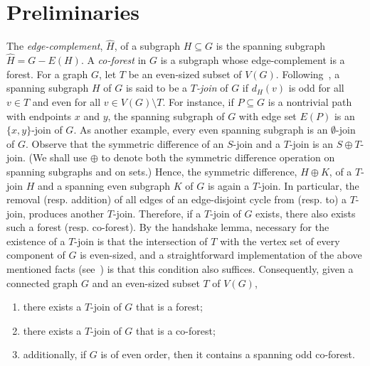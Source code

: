 \documentclass[a4paper,12pt]{article}
\numberwithin{equation}{section}
\begin{document}

\section{Preliminaries}

The \textit{edge-complement}, $\hat{H}$, of a subgraph $H\subseteq G$ is the spanning subgraph $\hat{H}=G-E(H)$.
A \textit{co-forest} in $G$ is a subgraph whose edge-complement is a forest.
For a graph $G$, let $T$ be an even-sized subset of $V(G)$. Following~\cite{BonMur08}, a spanning subgraph $H$ of $G$ is said to be a \textit{$T$-join} of $G$ if $d_{H}(v)$ is odd for all $v\in T$ and even for all $v\in V(G)\setminus T$. For instance, if $P\subseteq G$ is a nontrivial path with endpoints $x$ and $y$, the spanning subgraph of $G$ with edge set $E(P)$ is an $\{x,y\}$-join of $G$. As another example, every even spanning subgraph is an $\emptyset$-join of $G$. Observe that the symmetric difference of an $S$-join and a $T$-join is an $S\oplus T$-join. (We shall use $\oplus$ to denote both the symmetric difference operation on spanning subgraphs and on sets.) Hence, the symmetric difference, $H\oplus K$, of a $T$-join $H$ and a spanning even subgraph $K$ of $G$ is again a $T$-join. In particular, the removal (resp. addition) of all edges of an edge-disjoint cycle from (resp. to) a $T$-join, produces another $T$-join. Therefore, if a $T$-join of $G$ exists, there also exists such a forest (resp. co-forest). By the handshake lemma, necessary for the existence of a $T$-join is that the intersection of $T$ with the vertex set of every component of $G$ is even-sized, and a straightforward implementation of the  above mentioned facts (see~\cite{Sch03}) is that this condition also suffices. Consequently, given a connected graph $G$ and an even-sized subset $T$ of $V(G)$,
\begin{enumerate}
\item[$(1)$] there exists a $T$-join of $G$ that is a forest;
\item[$(2)$] there exists a $T$-join of $G$ that is a co-forest;
\item[$(3)$] additionally, if $G$ is of even order, then it contains a spanning odd co-forest.
\end{enumerate}


\smallskip
\end{document}
